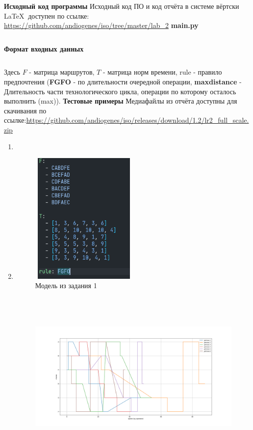 \documentclass[a4paper,12pt]{article}
\begin{document}
\begin{flushleft}
\begin{enumerate}
  \textbf{Исходный код программы}\newline\linebreak
  Исходный код ПО и код отчёта в системе вёртски \LaTeX $~$ доступен по ссылке: \url{https://github.com/andiogenes/iso/tree/master/lab_2}\newline\linebreak
  \textbf{main.py}
  \inputminted[breaklines]{python}{../main.py}
  \textbf{Формат входных данных}
  \inputminted[breaklines]{yaml}{../input.yaml}
  Здесь $F$ - матрица маршрутов, $T$ - матрица норм времени, rule - правило предпочтения (\textbf{FGFO} - по длительности очередной операции, \textbf{maxdistance} - Длительность части технологического цикла, операции по которому осталось выполнить (max)).\newpage
  \textbf{Тестовые примеры}\newline
  Медиафайлы из отчёта доступны для скачивания по ссылке:\url{https://github.com/andiogenes/iso/releases/download/1.2/lr2_full_scale.zip}
  \begin{enumerate}
    \item \item
    \begin{figure}[H]
      \includegraphics[width=5.25cm,height=6.5cm]{test_1_input.png}
      \centering
      \caption{\small{Модель из задания 1}}
    \end{figure}
    \begin{figure}[H]
      \includegraphics[width=18.25cm,height=8.5cm]{test_1.png}

\end{figure}
\end{enumerate}
\end{enumerate}
\end{flushleft}
\end{document}
